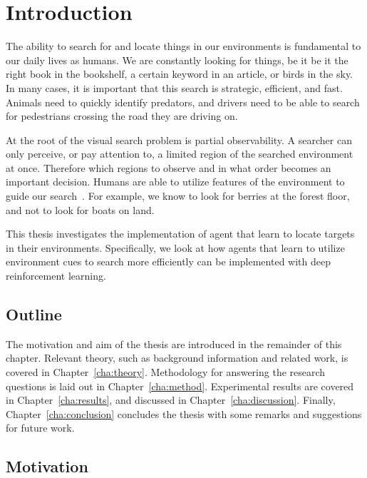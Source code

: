 \chapter{Introduction}
\label{cha:introduction}

The ability to search for and locate things in our environments is fundamental to our daily lives as humans.
We are constantly looking for things, be it be it the right book in the bookshelf, a certain keyword in an article, or birds in the sky.
In many cases, it is important that this search is strategic, efficient, and fast.
Animals need to quickly identify predators, and drivers need to be able to search for pedestrians crossing the road they are driving on.

At the root of the visual search problem is partial observability.
A searcher can only perceive, or pay attention to, a limited region of the searched environment at once.
Therefore which regions to observe and in what order becomes an important decision. 
Humans are able to utilize features of the environment to guide our search~\cite{wolfe_five_2017,eckstein_visual_2011,nakayama_situating_2011}.
For example, we know to look for berries at the forest floor, and not to look for boats on land.

This thesis investigates the implementation of agent that learn to locate targets in their environments.
Specifically, we look at how agents that learn to utilize environment cues to search more efficiently can be implemented with deep reinforcement learning.

\section{Outline}
\label{sec:outline}

The motivation and aim of the thesis are introduced in the remainder of this chapter. 
Relevant theory, such as background information and related work, is covered in Chapter~\ref{cha:theory}.
Methodology for answering the research questions is laid out in Chapter~\ref{cha:method}.
Experimental results are covered in Chapter~\ref{cha:results}, and discussed in Chapter~\ref{cha:discussion}.
Finally, Chapter~\ref{cha:conclusion} concludes the thesis with some remarks and suggestions for future work.

\section{Motivation}
\label{sec:motivation}

